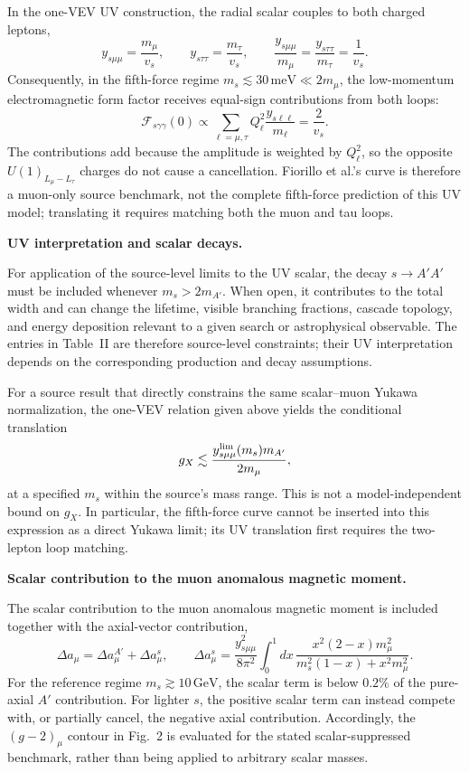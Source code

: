 \documentclass[12pt,a4paper]{article}
\begin{document}
In the one-VEV UV construction, the radial scalar couples to both charged leptons,
\[
y_{s\mu\mu}=\frac{m_\mu}{v_s},\qquad
y_{s\tau\tau}=\frac{m_\tau}{v_s},\qquad
\frac{y_{s\mu\mu}}{m_\mu}
=\frac{y_{s\tau\tau}}{m_\tau}
=\frac{1}{v_s}.
\]
Consequently, in the fifth-force regime \(m_s\lesssim30\,\mathrm{meV}\ll2m_\mu\), the low-momentum electromagnetic form factor receives equal-sign contributions from both loops:
\[
\mathcal F_{s\gamma\gamma}(0)
\propto
\sum_{\ell=\mu,\tau}Q_\ell^2
\frac{y_{s\ell\ell}}{m_\ell}
=\frac{2}{v_s}.
\]
The contributions add because the amplitude is weighted by \(Q_\ell^2\), so the opposite \(U(1)_{L_\mu-L_\tau}\) charges do not cause a cancellation. Fiorillo et al.'s curve is therefore a muon-only source benchmark, not the complete fifth-force prediction of this UV model; translating it requires matching both the muon and tau loops.

\noindent\textbf{UV interpretation and scalar decays.}

For application of the source-level limits to the UV scalar, the decay \(s\to A'A'\) must be included whenever \(m_s>2m_{A'}\). When open, it contributes to the total width and can change the lifetime, visible branching fractions, cascade topology, and energy deposition relevant to a given search or astrophysical observable. The entries in Table~II are therefore source-level constraints; their UV interpretation depends on the corresponding production and decay assumptions.

For a source result that directly constrains the same scalar--muon Yukawa normalization, the one-VEV relation given above yields the conditional translation
\[
g_X\lesssim\frac{y_{s\mu\mu}^{\rm lim}(m_s)m_{A'}}{2m_\mu},
\]
at a specified \(m_s\) within the source's mass range. This is not a model-independent bound on \(g_X\). In particular, the fifth-force curve cannot be inserted into this expression as a direct Yukawa limit; its UV translation first requires the two-lepton loop matching.

\noindent\textbf{Scalar contribution to the muon anomalous magnetic moment.}

The scalar contribution to the muon anomalous magnetic moment is included together with the axial-vector contribution,
\[
\Delta a_\mu=\Delta a_\mu^{A'}+\Delta a_\mu^s,
\qquad
\Delta a_\mu^s=
\frac{y_{s\mu\mu}^2}{8\pi^2}
\int_0^1 dx\,
\frac{x^2(2-x)m_\mu^2}
{m_s^2(1-x)+x^2m_\mu^2}.
\]
For the reference regime \(m_s\gtrsim10\,\mathrm{GeV}\), the scalar term is below \(0.2\%\) of the pure-axial \(A'\) contribution. For lighter \(s\), the positive scalar term can instead compete with, or partially cancel, the negative axial contribution. Accordingly, the \((g-2)_\mu\) contour in Fig.~2 is evaluated for the stated scalar-suppressed benchmark, rather than being applied to arbitrary scalar masses.
\end{document}
